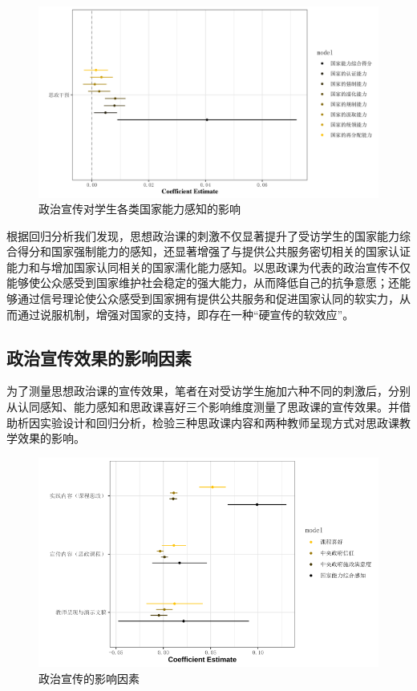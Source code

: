 \documentclass[
  12pt,
]{ctexart}
\begin{document}
\begin{figure}[h]
\includegraphics[width=1\linewidth]{../figures/figure3} \caption{政治宣传对学生各类国家能力感知的影响}\label{fig:unnamed-chunk-7}
\end{figure}

根据回归分析我们发现，思想政治课的刺激不仅显著提升了受访学生的国家能力综合得分和国家强制能力的感知，还显著增强了与提供公共服务密切相关的国家认证能力和与增加国家认同相关的国家濡化能力感知。以思政课为代表的政治宣传不仅能够使公众感受到国家维护社会稳定的强大能力，从而降低自己的抗争意愿；还能够通过信号理论使公众感受到国家拥有提供公共服务和促进国家认同的软实力，从而通过说服机制，增强对国家的支持，即存在一种``硬宣传的软效应''。

\hypertarget{ux653fux6cbbux5ba3ux4f20ux6548ux679cux7684ux5f71ux54cdux56e0ux7d20}{%
\subsection{政治宣传效果的影响因素}\label{ux653fux6cbbux5ba3ux4f20ux6548ux679cux7684ux5f71ux54cdux56e0ux7d20}}

为了测量思想政治课的宣传效果，笔者在对受访学生施加六种不同的刺激后，分别从认同感知、能力感知和思政课喜好三个影响维度测量了思政课的宣传效果。并借助析因实验设计和回归分析，检验三种思政课内容和两种教师呈现方式对思政课教学效果的影响。

\begin{figure}[h]
\includegraphics[width=1\linewidth]{../figures/figure4} \caption{政治宣传的影响因素}\label{fig:unnamed-chunk-9}
\end{figure}
\end{document}
